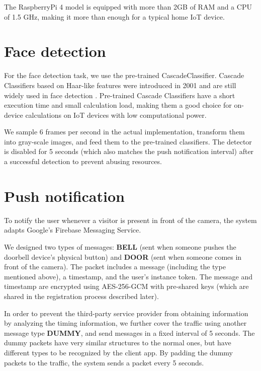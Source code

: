 The RaspberryPi 4 model is equipped with more than 2GB of RAM and a CPU of 1.5 GHz, making it more than enough for a typical home IoT device.

\section{Face detection}

For the face detection task, we use the pre-trained CascadeClassifier. Cascade Classifiers based on Haar-like features were introduced in 2001 and are still widely used in face detection \cite{sharifara2014general}. Pre-trained Cascade Classifiers have a short execution time and small calculation load, making them a good choice for on-device calculations on IoT devices with low computational power.

We sample 6 frames per second in the actual implementation, transform them into gray-scale images, and feed them to the pre-trained classifiers. The detector is disabled for 5 seconds (which also matches the push notification interval) after a successful detection to prevent abusing resources. 

\section{Push notification}
To notify the user whenever a visitor is present in front of the camera, the system adapts Google's Firebase Messaging Service.

We designed two types of messages: \textbf{BELL} (sent when someone pushes the doorbell device’s physical button) and \textbf{DOOR} (sent when someone comes in front of the camera). The packet includes a message (including the type mentioned above), a timestamp, and the user's instance token. The message and timestamp are encrypted using AES-256-GCM with pre-shared keys (which are shared in the registration process described later).

In order to prevent the third-party service provider from obtaining information by analyzing the timing information, we further cover the traffic using another message type \textbf{DUMMY}, and send messages in a fixed interval of 5 seconds. The dummy packets have very similar structures to the normal ones, but have different types to be recognized by the client app. By padding the dummy packets to the traffic, the system sends a packet every 5 seconds.






